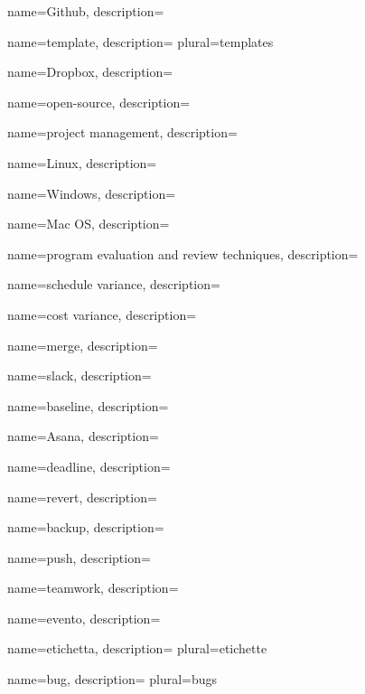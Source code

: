  {
	name=Github,
	description={\TODO{}}
}

 {
	name=template,
	description={\TODO{}}
	plural=templates
}

 {
	name=Dropbox,
	description={\TODO{}}
}

 {
	name=open-source,
	description={\TODO{}}
}

 {
	name=project management,
	description={\TODO{}}
}

 {
	name=Linux,
	description={\TODO{}}
}

 {
	name=Windows,
	description={\TODO{}}
}

 {
	name=Mac OS,
	description={\TODO{}}
}

 {
	name=program evaluation and review techniques,
	description={\TODO{}}
}

 {
	name=schedule variance,
	description={\TODO{}}
}

 {
	name=cost variance,
	description={\TODO{}}
}


 {
	name=merge,
	description={\TODO{}}
}

 {
	name=slack,
	description={\TODO{}}
}

 {
	name=baseline,
	description={\TODO{}}
}

 {
	name=Asana,
	description={\TODO{}}
}

 {
	name=deadline,
	description={\TODO{}}
}

 {
	name=revert,
	description={\TODO{}}
}

 {
	name=backup,
	description={\TODO{}}
}

 {
	name=push,
	description={\TODO{}}
}

 {
	name=teamwork,
	description={\TODO{}}
}

 {
	name=evento,
	description={\TODO{}}
}

 {
	name=etichetta,
	description={\TODO{}}
	plural=etichette
}

 {
	name=bug,
	description={\TODO{}}
	plural=bugs
}

